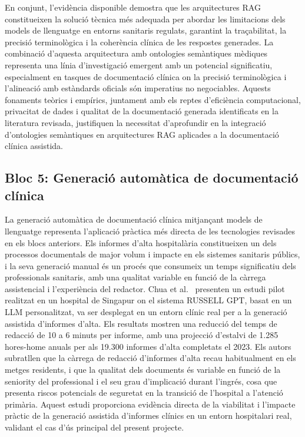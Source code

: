 \documentclass[CAT]{TFUOC}%
\begin{document}
En conjunt, l'evidència disponible demostra que les arquitectures RAG constitueixen la solució tècnica més adequada per abordar les limitacions dels models de llenguatge en entorns sanitaris regulats, garantint la traçabilitat, la precisió terminològica i la coherència clínica de les respostes generades. La combinació d'aquesta arquitectura amb ontologies semàntiques mèdiques representa una línia d'investigació emergent amb un potencial significatiu, especialment en tasques de documentació clínica on la precisió terminològica i l'alineació amb estàndards oficials són imperatius no negociables. Aquests fonaments teòrics i empírics, juntament amb els reptes d'eficiència computacional, privacitat de dades i qualitat de la documentació generada identificats en la literatura revisada, justifiquen la necessitat d'aprofundir en la integració d'ontologies semàntiques en arquitectures RAG aplicades a la documentació clínica assistida.

\subsection{Bloc 5: Generació automàtica de documentació clínica}

La generació automàtica de documentació clínica mitjançant models de llenguatge representa l'aplicació pràctica més directa de les tecnologies revisades en els blocs anteriors. Els informes d'alta hospitalària constitueixen un dels processos documentals de major volum i impacte en els sistemes sanitaris públics, i la seva generació manual és un procés que consumeix un temps significatiu dels professionals sanitaris, amb una qualitat variable en funció de la càrrega assistencial i l'experiència del redactor. Chua et al.~\cite{chua2024discharge} presenten un estudi pilot realitzat en un hospital de Singapur on el sistema RUSSELL GPT, basat en un LLM personalitzat, va ser desplegat en un entorn clínic real per a la generació assistida d'informes d'alta. Els resultats mostren una reducció del temps de redacció de 10 a 6 minuts per informe, amb una projecció d'estalvi de 1.285 hores-home anuals per als 19.300 informes d'alta completats el 2023. Els autors subratllen que la càrrega de redacció d'informes d'alta recau habitualment en els metges residents, i que la qualitat dels documents és variable en funció de la seniority del professional i el seu grau d'implicació durant l'ingrés, cosa que presenta riscos potencials de seguretat en la transició de l'hospital a l'atenció primària. Aquest estudi proporciona evidència directa de la viabilitat i l'impacte pràctic de la generació assistida d'informes clínics en un entorn hospitalari real, validant el cas d'ús principal del present projecte.
\end{document}
